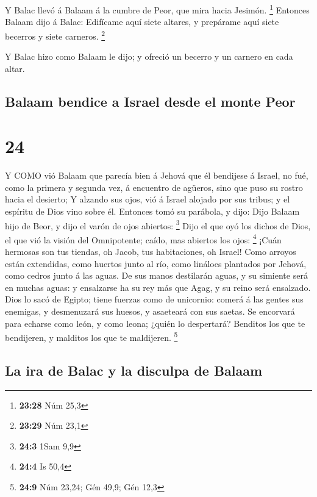 Y Balac llevó á Balaam á la cumbre de Peor, que mira hacia
Jesimón. \footnote{\textbf{23:28} Núm 25,3}  Entonces
Balaam dijo á Balac: Edifícame aquí siete altares, y prepárame aquí
siete becerros y siete carneros. \footnote{\textbf{23:29} Núm 23,1}

 Y Balac hizo como Balaam le dijo; y ofreció un becerro y
un carnero en cada altar.

\hypertarget{balaam-bendice-a-israel-desde-el-monte-peor}{%
\subsection{Balaam bendice a Israel desde el monte
Peor}\label{balaam-bendice-a-israel-desde-el-monte-peor}}

\hypertarget{section-23}{%
\section{24}\label{section-23}}

 Y COMO vió Balaam que parecía bien á Jehová que él
bendijese á Israel, no fué, como la primera y segunda vez, á encuentro
de agüeros, sino que puso su rostro hacia el desierto;  Y
alzando sus ojos, vió á Israel alojado por sus tribus; y el espíritu de
Dios vino sobre él.  Entonces tomó su parábola, y dijo: Dijo
Balaam hijo de Beor, y dijo el varón de ojos abiertos: \footnote{\textbf{24:3}
  1Sam 9,9}  Dijo el que oyó los dichos de Dios, el que vió
la visión del Omnipotente; caído, mas abiertos los ojos: \footnote{\textbf{24:4}
  Is 50,4}  ¡Cuán hermosas son tus tiendas, oh Jacob, tus
habitaciones, oh Israel!  Como arroyos están extendidas,
como huertos junto al río, como lináloes plantados por Jehová, como
cedros junto á las aguas.  De sus manos destilarán aguas, y
su simiente será en muchas aguas: y ensalzarse ha su rey más que Agag, y
su reino será ensalzado.  Dios lo sacó de Egipto; tiene
fuerzas como de unicornio: comerá á las gentes sus enemigas, y
desmenuzará sus huesos, y asaeteará con sus saetas.  Se
encorvará para echarse como león, y como leona; ¿quién lo despertará?
Benditos los que te bendijeren, y malditos los que te maldijeren.
\footnote{\textbf{24:9} Núm 23,24; Gén 49,9; Gén 12,3}

\hypertarget{la-ira-de-balac-y-la-disculpa-de-balaam}{%
\subsection{La ira de Balac y la disculpa de
Balaam}\label{la-ira-de-balac-y-la-disculpa-de-balaam}}

